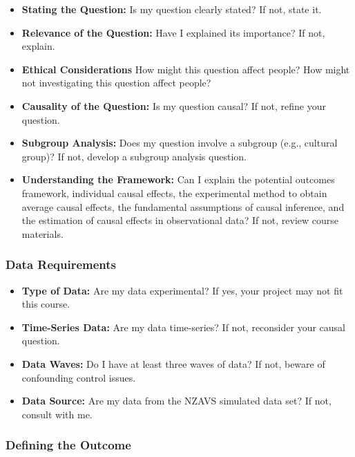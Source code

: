 \documentclass[
  singlecolumn]{article}
\providecommand{\tightlist}{%
  \setlength{\itemsep}{0pt}\setlength{\parskip}{0pt}}\usepackage{longtable,booktabs,array}
\begin{document}
\begin{itemize}
\tightlist
\item
  \textbf{Stating the Question:} Is my question clearly stated? If not,
  state it.
\item
  \textbf{Relevance of the Question:} Have I explained its importance?
  If not, explain.
\item
  \textbf{Ethical Considerations} How might this question affect people?
  How might not investigating this question affect people?
\item
  \textbf{Causality of the Question:} Is my question causal? If not,
  refine your question.
\item
  \textbf{Subgroup Analysis:} Does my question involve a subgroup (e.g.,
  cultural group)? If not, develop a subgroup analysis question.
\item
  \textbf{Understanding the Framework:} Can I explain the potential
  outcomes framework, individual causal effects, the experimental method
  to obtain average causal effects, the fundamental assumptions of
  causal inference, and the estimation of causal effects in
  observational data? If not, review course materials.
\end{itemize}

\hypertarget{data-requirements}{%
\subsubsection{Data Requirements}\label{data-requirements}}

\begin{itemize}
\tightlist
\item
  \textbf{Type of Data:} Are my data experimental? If yes, your project
  may not fit this course.
\item
  \textbf{Time-Series Data:} Are my data time-series? If not, reconsider
  your causal question.
\item
  \textbf{Data Waves:} Do I have at least three waves of data? If not,
  beware of confounding control issues.
\item
  \textbf{Data Source:} Are my data from the NZAVS simulated data set?
  If not, consult with me.
\end{itemize}

\hypertarget{defining-the-outcome}{%
\subsubsection{Defining the Outcome}\label{defining-the-outcome}}
\end{document}
